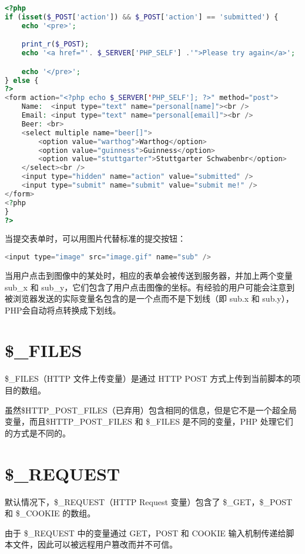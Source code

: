 \begin{lstlisting}[language=PHP]
<?php
if (isset($_POST['action']) && $_POST['action'] == 'submitted') {
    echo '<pre>';

    print_r($_POST);
    echo '<a href="'. $_SERVER['PHP_SELF'] .'">Please try again</a>';

    echo '</pre>';
} else {
?>
<form action="<?php echo $_SERVER['PHP_SELF']; ?>" method="post">
    Name:  <input type="text" name="personal[name]"><br />
    Email: <input type="text" name="personal[email]"><br />
    Beer: <br>
    <select multiple name="beer[]">
        <option value="warthog">Warthog</option>
        <option value="guinness">Guinness</option>
        <option value="stuttgarter">Stuttgarter Schwabenbr</option>
    </select><br />
    <input type="hidden" name="action" value="submitted" />
    <input type="submit" name="submit" value="submit me!" />
</form>
<?php
}
?>
\end{lstlisting}

当提交表单时，可以用图片代替标准的提交按钮：

\begin{lstlisting}[language=PHP]
<input type="image" src="image.gif" name="sub" />
\end{lstlisting}

当用户点击到图像中的某处时，相应的表单会被传送到服务器，并加上两个变量 sub\_x 和 sub\_y，它们包含了用户点击图像的坐标。有经验的用户可能会注意到被浏览器发送的实际变量名包含的是一个点而不是下划线（即 sub.x 和 sub.y），PHP会自动将点转换成下划线。


\section{\$\_FILES}

\$\_FILES（HTTP 文件上传变量）是通过 HTTP POST 方式上传到当前脚本的项目的数组。

虽然\$HTTP\_POST\_FILES（已弃用）包含相同的信息，但是它不是一个超全局变量，而且\$HTTP\_POST\_FILES 和 \$\_FILES 是不同的变量，PHP 处理它们的方式是不同的。


\section{\$\_REQUEST}


默认情况下，\$\_REQUEST（HTTP Request 变量）包含了 \$\_GET，\$\_POST 和 \$\_COOKIE 的数组。

由于 \$\_REQUEST 中的变量通过 GET，POST 和 COOKIE 输入机制传递给脚本文件，因此可以被远程用户篡改而并不可信。

